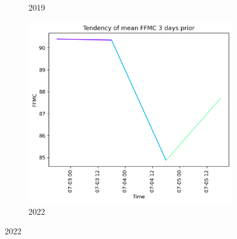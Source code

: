 \begin{figure}[h]
\begin{subfigure}{0.3\textwidth}
		\caption{2019}
		\label{fig:ffmc_prior_3_days_2019}
	\end{subfigure}
	\hfill
	\begin{subfigure}{0.3\textwidth}
		\centering
		\includegraphics[width=\textwidth]{graphs/3days/2022_3daysprior_tendency_graph_FFMC.png}
		\caption{2022}
		\label{fig:ffmc_prior_3_days_2022}
	\end{subfigure}
	
	\label{fig:ffmc_values_3days_prior}
\end{figure}

